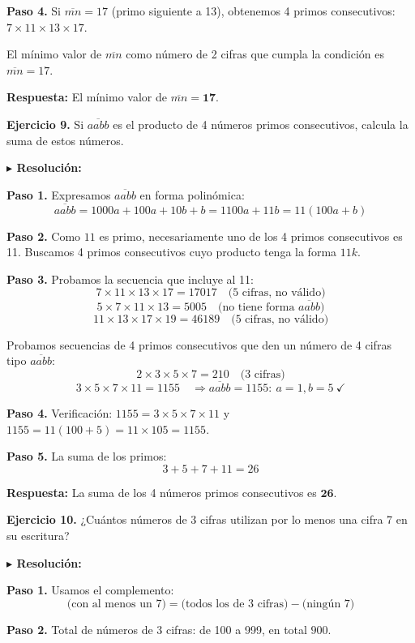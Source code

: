 \documentclass[10pt]{article}
\newcommand{\ejercicio}[2]{%
  \begin{enuncbox}
    \textbf{\textcolor{enunciado}{Ejercicio #1.}} #2
  \end{enuncbox}
}
\newcommand{\resolucion}{\vspace{2pt}\textbf{\textcolor{resolucion}{$\blacktriangleright$ Resolución:}}\vspace{4pt}}
\newcommand{\respuesta}[1]{%
  \begin{respbox}
    \textbf{\textcolor{respuesta}{Respuesta:}} #1
  \end{respbox}
}
\begin{document}
\textbf{Paso 4.} Si $\overline{mn} = 17$ (primo siguiente a 13), obtenemos 4 primos consecutivos: $7 \times 11 \times 13 \times 17$.

El mínimo valor de $\overline{mn}$ como número de 2 cifras que cumpla la condición es $\overline{mn} = 17$.

\respuesta{El mínimo valor de $\overline{mn} = \mathbf{17}$.}

\ejercicio{9}{Si $\overline{aabb}$ es el producto de 4 números primos consecutivos, calcula la suma de estos números.}

\resolucion

\textbf{Paso 1.} Expresamos $\overline{aabb}$ en forma polinómica:
\[
    \overline{aabb} = 1000a + 100a + 10b + b = 1100a + 11b = 11(100a + b)
\]

\textbf{Paso 2.} Como $11$ es primo, necesariamente uno de los 4 primos consecutivos es 11. Buscamos 4 primos consecutivos cuyo producto tenga la forma $11k$.

\textbf{Paso 3.} Probamos la secuencia que incluye al 11:
\[
    7 \times 11 \times 13 \times 17 = 17017 \quad \text{(5 cifras, no válido)}
\]
\[
    5 \times 7 \times 11 \times 13 = 5005 \quad \text{(no tiene forma } \overline{aabb}\text{)}
\]
\[
    11 \times 13 \times 17 \times 19 = 46189 \quad \text{(5 cifras, no válido)}
\]

Probamos secuencias de 4 primos consecutivos que den un número de 4 cifras tipo $\overline{aabb}$:
\[
    2 \times 3 \times 5 \times 7 = 210 \quad \text{(3 cifras)}
\]
\[
    3 \times 5 \times 7 \times 11 = 1155 \quad \Rightarrow \overline{aabb} = 1155:\ a=1,b=5\ \checkmark
\]

\textbf{Paso 4.} Verificación: $1155 = 3 \times 5 \times 7 \times 11$ y $1155 = 11(100 + 5) = 11 \times 105 = 1155$. \checkmark

\textbf{Paso 5.} La suma de los primos:
\[
    3 + 5 + 7 + 11 = 26
\]

\respuesta{La suma de los 4 números primos consecutivos es $\mathbf{26}$.}

\ejercicio{10}{¿Cuántos números de 3 cifras utilizan por lo menos una cifra 7 en su escritura?}

\resolucion

\textbf{Paso 1.} Usamos el complemento:
\[
    \text{(con al menos un 7)} = \text{(todos los de 3 cifras)} - \text{(ningún 7)}
\]

\textbf{Paso 2.} Total de números de 3 cifras: de 100 a 999, en total $900$.
\end{document}
